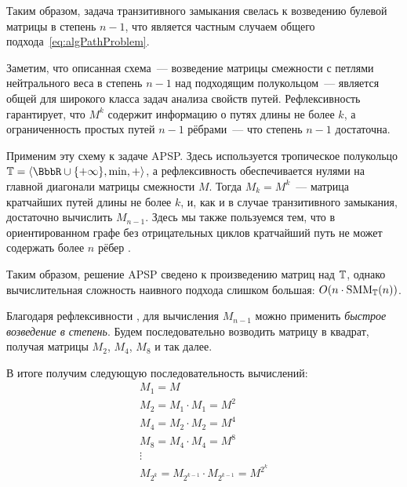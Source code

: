  Таким образом, задача транзитивного замыкания свелась к возведению булевой матрицы в степень%
  $n-1$, что является частным случаем общего подхода~\eqref{eq:algPathProblem}.

 Заметим, что описанная схема~--- возведение матрицы смежности с петлями нейтрального веса в степень $n-1$ над подходящим полукольцом~--- является общей для широкого класса задач анализа свойств путей.
 Рефлексивность гарантирует, что $M^k$ содержит информацию о путях длины не более $k$, а ограниченность простых путей $n-1$ рёбрами~--- что степень $n-1$ достаточна.

 Применим эту схему к задаче APSP.
 Здесь используется тропическое полукольцо $\algebraic{T} = \langle \BbbR \cup \{+\infty\}, \min, + \rangle$, а рефлексивность обеспечивается нулями на главной диагонали матрицы смежности $M$.
 Тогда $M_k = M^k$~--- матрица кратчайших путей длины не более $k$, и, как и в случае транзитивного замыкания, достаточно вычислить $M_{n-1}$.
 Здесь мы также пользуемся тем, что в ориентированном графе без отрицательных циклов кратчайший путь не может содержать более $n$ рёбер%
 .

 Таким образом, решение APSP сведено к произведению матриц над $\mathbb{T}$, однако вычислительная сложность наивного подхода слишком большая: $O(n \cdot \operatorname{SMM}_{\mathbb{T}}(n))$.

 Благодаря рефлексивности%
 , для вычисления $M_{n-1}$ можно применить \emph{быстрое возведение в степень}.
 Будем последовательно возводить матрицу в квадрат, получая матрицы $M_2$, $M_4$, $M_8$ и так далее.

 В итоге получим следующую последовательность вычислений:
 \begin{gather*}
     M_1 = M \\
     M_2 = M_1 \cdot M_1 = M^2 \\
     M_4 = M_2 \cdot M_2 = M^4 \\
     M_8 = M_4 \cdot M_4 = M^8 \\
     \vdots \\
     M_{2^k} = M_{2^{k-1}} \cdot M_{2^{k-1}} = M^{2^k}
 \end{gather*}

